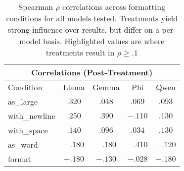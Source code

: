 \renewcommand{\arraystretch}{1.3}
\begin{table}[t]
\centering
\small
\begin{tabular}{|l|c|c|c|c|}
\multicolumn{5}{c}{\textbf{Correlations (Post-Treatment)}} \\
\hline
\cellcolor{lightgray}Condition & \cellcolor{lightgray}Llama & \cellcolor{lightgray}Gemma & \cellcolor{lightgray}Phi & \cellcolor{lightgray}Qwen \\
\hline
\hline
as\_large & $\mathbf{.320}$ & $.048$ & $.069$ & $.093$ \\
\hline
with\_newline & $\mathbf{.250}$ & $\mathbf{.390}$ & $-.110$ & $\mathbf{.130}$ \\
\hline
with\_space & $\mathbf{.140}$ & $.096$ & $.034$ & $\mathbf{.130}$ \\
\hline
as\_word & $-.180$ & $-.180$ & $-.410$ & $-.120$ \\
\hline
format & $-.180$ & $-.130$ & $-.028$ & $-.180$ \\
\hline
\end{tabular}
\caption{Spearman $\rho$ correlations across formatting conditions for all models tested. Treatments yield strong influence over results, but differ on a per-model basis. Highlighted values are where treatments result in $\rho\geq.1$}
\label{tab:treatment-correlations}
\end{table}